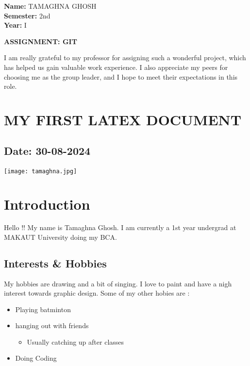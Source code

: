 \documentclass[12pt]{article}
\begin{document}
\begin{flushright}
\textbf{Name:} TAMAGHNA GHOSH \\
\textbf{Semester:} 2nd \\
\textbf{Year:} I \\
\end{flushright}

\begin{center}
\Huge \textbf{ASSIGNMENT: GIT}
\end{center}

I am really grateful to my professor for assigning such a wonderful project, which has helped us gain valuable work experience. I also appreciate my peers for choosing me as the group leader, and I hope to meet their expectations in this role.


\newpage

\section{MY FIRST LATEX DOCUMENT}
\subsection*{Date: 30-08-2024}

\begin{center}
    \texttt{[image: tamaghna.jpg]}\\[1cm]
    
\end{center}

\section*{Introduction}
Hello !! My name is Tamaghna Ghosh. I am currently a 1st year undergrad at MAKAUT University doing my BCA.

\subsection*{Interests \& Hobbies}
My hobbies are drawing and a bit of singing. I love to paint and have a nigh interest towards graphic design. Some of my other hobies are :

\begin{itemize}
    \item Playing batminton
    \item hanging out with friends
        \begin{itemize}
            \item Usually catching up after classes
        \end{itemize}
    \item Doing Coding
\end{itemize}
\end{document}
